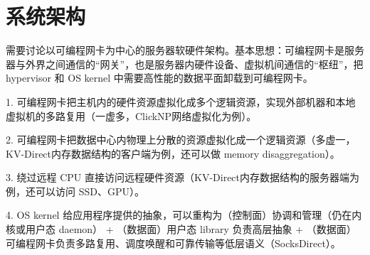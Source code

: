 \chapter{系统架构}

需要讨论以可编程网卡为中心的服务器软硬件架构。基本思想：可编程网卡是服务器与外界之间通信的“网关”，也是服务器内硬件设备、虚拟机间通信的“枢纽”，把 hypervisor 和 OS kernel 中需要高性能的数据平面卸载到可编程网卡。

1. 可编程网卡把主机内的硬件资源虚拟化成多个逻辑资源，实现外部机器和本地虚拟机的多路复用（一虚多，ClickNP网络虚拟化为例）。

2. 可编程网卡把数据中心内物理上分散的资源虚拟化成一个逻辑资源（多虚一，KV-Direct内存数据结构的客户端为例，还可以做 memory disaggregation）。

3. 绕过远程 CPU 直接访问远程硬件资源（KV-Direct内存数据结构的服务器端为例，还可以访问 SSD、GPU）。

4. OS kernel 给应用程序提供的抽象，可以重构为（控制面）协调和管理（仍在内核或用户态 daemon） + （数据面）用户态 library 负责高层抽象 + （数据面）可编程网卡负责多路复用、调度唤醒和可靠传输等低层语义（SocksDirect）。